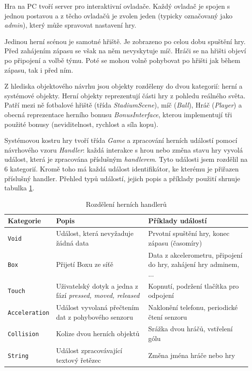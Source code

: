 \documentclass[thesis=B,czech,hidelinks]{FITthesis}[2012/06/26] %
\newcommand{\code}[1]{\texttt{#1}}
\begin{document}

Hra na PC tvoří server pro interaktivní ovladače. Každý ovladač je spojen s jednou postavou a z těcho ovladačů je zvolen jeden (typicky označovaný jako \textit{admin}), který může spravovat nastavení hry.

Jedinou herní scénou je samotné hřiště. Je zobrazeno po celou dobu spuštění hry. Před zahájením zápasu se však na něm nevyskytuje míč. Hráči se na hřišti objeví po připojení a volbě týmu. Poté se mohou volně pohybovat po hřišti jak během zápasu, tak i před ním. 

Z hlediska objektového návrhu jsou objekty rozděleny do dvou kategorií: herní a systémové objekty. Herní objekty reprezentují části hry z pohledu reálného světa. Patří mezi ně fotbalové hřiště (třída \textit{StadiumScene}), míč (\textit{Ball}), Hráč (\textit{Player}) a obecná reprezentace herního bonusu \textit{BonusInterface}, kterou implementují tři použité bonusy (neviditelnost, rychlost a síla kopu). 

Systémovou kostru hry tvoří třída \textit{Game} a zpracování herních událostí pomocí návrhového vzoru \textit{Handler}\cite{patterns}: každá interakce s hrou nebo změna stavu hry vyvolá událost, která je zpracována příslušným \textit{handlerem}. Tyto události jsem rozdělil na 6 kategorií. Kromě toho má každá událost identifikátor, ke kterému je přiřazen příslušný handler. Přehled typů událostí, jejich popis a příklady použití shrnuje tabulka \ref{table:handlers}.

\begin{table}[h]
\caption{Rozdělení herních handlerů}
\label{table:handlers}
\begin{tabularx}{\textwidth}{|X|X|X|}
\hline
\textbf{Kategorie} & \textbf{Popis} & \textbf{Příklady událostí} \\ \hline
\code{Void} & Událost, která nevyžaduje žádná data & Prvotní spuštění hry, konec zápasu (časomíry) \\ \hline
\code{Box} & Přijetí Boxu ze síťě & Data z akcelerometru, připojení do hry, zahájení hry adminem, ... \\ \hline
\code{Touch} & Uživatelský dotyk a jedna z fází \textit{pressed, moved, released} & Kopnutí, podržení tlačítka pro odpojení \\ \hline
\code{Acceleration} & Událost vyvolaná přečtením dat z pohybového senzoru & Naklonění telefonu, periodické čtení senzoru \\ \hline
\code{Collision} & Kolize dvou herních objektů & Srážka dvou hráčů, vstřelení gólu\\ \hline
\code{String} & Událost zpracovávající textový řetězec & Změna jména hráče nebo hry \\ \hline

\end{tabularx}
\end{table}
\end{document}
